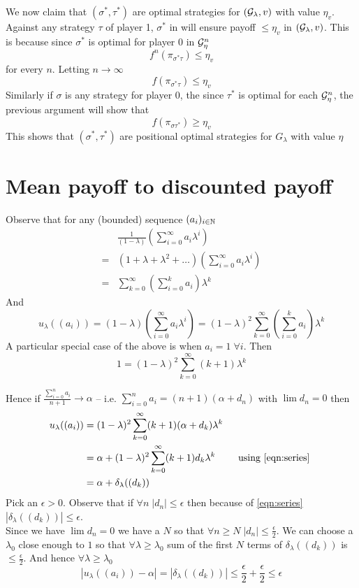 We now claim that $(\sigma^*, \tau^*)$ are optimal strategies for $(\mathcal{G}_\lambda,v)$ with value $\eta_v$.
Against any strategy $\tau$ of player 1, $\sigma^*$ in will ensure payoff $\leq \eta_v$ in $(\mathcal{G}_\lambda,v)$. This is because since $\sigma^*$ is optimal for player 0 in $\mathcal{G}^n_\eta$
\[
    f^n(\pi_{\sigma^*\tau}) \leq \eta_v
\]
for every $n$. Letting $n \to \infty$ 
\[
    f(\pi_{\sigma^*\tau}) \leq \eta_v
\]
Similarly if $\sigma$ is any strategy for player 0, the since $\tau^*$ is optimal for each $\mathcal{G}^n_\eta$, the previous argument will show that
\[
    f(\pi_{\sigma\tau^*}) \geq \eta_v
\]
This shows that $(\sigma^*,\tau^*)$ are positional optimal strategies for $G_\lambda$ with value $\eta$

\section{Mean payoff to discounted payoff}
Observe that for any (bounded) sequence $(a_i)_{i \in \mathbb{N}}$
\begin{align}
    &\frac{1}{(1-\lambda)} \left(\sum_{i=0}^\infty a_i\lambda^i\right)\\
    = &(1+\lambda+\lambda^2+\ldots) (\sum_{i=0}^\infty a_i \lambda^i)\\
    = &\sum_{k=0}^\infty \left(\sum_{i=0}^k a_i\right) \lambda^k
\end{align}
And 
\begin{equation}
    u_\lambda((a_i)) = (1-\lambda)\left(\sum_{i=0}^\infty a_i\lambda^i\right) = (1-\lambda)^2\sum_{k=0}^\infty \left(\sum_{i=0}^k a_i\right) \lambda^k \label{eqn:link}
\end{equation}
A particular special case of the above is when $a_i = 1 \; \forall i$. Then
\begin{equation}
    1 = (1-\lambda)^2 \sum_{k=0}^\infty (k+1)\lambda^k \label{eqn:series}
\end{equation}

Hence if $\frac{\sum_{i=0}^n a_i}{n+1} \to \alpha$ -- i.e. $\sum_{i=0}^n a_i = (n+1)(\alpha + d_n)$ with $\lim d_n = 0$ then 
\begin{align*}
    u_\lambda((a_i)) &= (1-\lambda)^2 \sum_{k=0}^\infty (k+1)(\alpha + d_k) \lambda^k\\
    &= \alpha + (1-\lambda)^2 \sum_{k=0}^\infty (k+1) d_k \lambda^k \qquad \text{ using \eqref{eqn:series} }\\
    &= \alpha + \delta_\lambda((d_k))
\end{align*}
Pick an $\epsilon > 0$. Observe that if $\forall n \; |d_n| \leq \epsilon$ then because of \eqref{eqn:series}  $|\delta_\lambda((d_k))| \leq \epsilon$.\\
Since we have $\lim d_n = 0$ we have a $N$ so that $\forall n\geq N \; |d_n| \leq \frac{\epsilon}{2}$. We can choose a $\lambda_0$ close enough to $1$ so that $\forall \lambda \geq \lambda_0$ sum of the first $N$ terms of $\delta_\lambda((d_k))$ is  $\leq \frac{\epsilon}{2}$. And hence $\forall \lambda \geq \lambda_0$
\[
    |u_\lambda((a_i)) - \alpha| = |\delta_\lambda((d_k))| \leq \frac{\epsilon}{2} + \frac{\epsilon}{2} \leq \epsilon
\]

